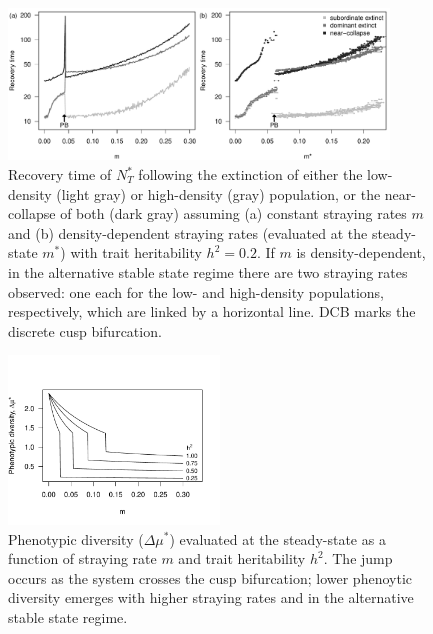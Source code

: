\documentclass{revtex4}
\begin{document}
\begin{figure}
  \captionsetup{justification=raggedright,
singlelinecheck=false
}
\centering
\includegraphics[width=0.9\textwidth]{fig_relax_lowh.pdf}
\caption{
Recovery time of $N_T^*$ following the extinction of either the low-density (light gray) or high-density (gray) population, or the near-collapse of both (dark gray) assuming (a) constant straying rates $m$ and (b) density-dependent straying rates (evaluated at the steady-state $m^*$) with trait heritability $h^2=0.2$.
If $m$ is density-dependent, in the alternative stable state regime there are two straying rates observed: one each for the low- and high-density populations, respectively, which are linked by a horizontal line.
DCB marks the discrete cusp bifurcation.
} \label{fig:relax}
\end{figure}


\begin{figure}
  \captionsetup{justification=raggedright,
singlelinecheck=false
}
\centering
\includegraphics[width=0.5\textwidth]{fig_traitdiff.pdf}
\caption{
Phenotypic diversity ($\Delta \mu^*$) evaluated at the steady-state as a function of straying rate $m$ and trait heritability $h^2$. The jump occurs as the system crosses the cusp bifurcation; lower phenoytic diversity emerges with higher straying rates and in the alternative stable state regime. 
} \label{fig:traitdiff}
\end{figure}
\end{document}
